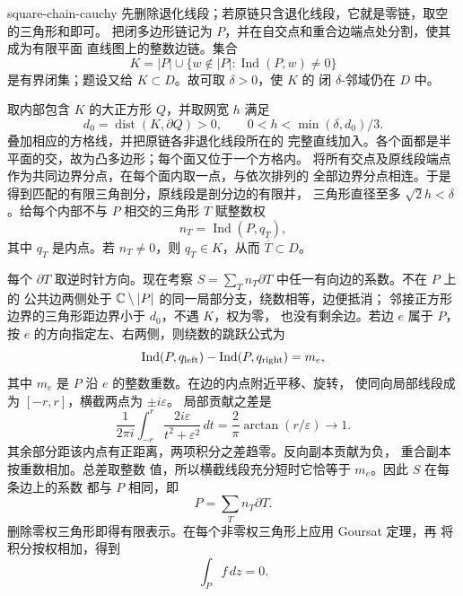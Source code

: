 \begin{solution}{square-chain-cauchy}
先删除退化线段；若原链只含退化线段，它就是零链，取空的三角形和即可。
把闭多边形链记为 \(P\)，并在自交点和重合边端点处分割，使其成为有限平面
直线图上的整数边链。集合
\[
 K=|P|\cup\{w\notin|P|:\operatorname{Ind}(P,w)\ne0\}
\]
是有界闭集；题设又给 \(K\subset D\)。故可取 \(\delta>0\)，使 \(K\) 的
闭 \(\delta\)-邻域仍在 \(D\) 中。

取内部包含 \(K\) 的大正方形 \(Q\)，并取网宽 \(h\) 满足
\[
 d_0=\operatorname{dist}(K,\partial Q)>0,
 \qquad 0<h<\min(\delta,d_0)/3.
\]
叠加相应的方格线，并把原链各非退化线段所在的
完整直线加入。各个面都是半平面的交，故为凸多边形；每个面又位于一个方格内。
将所有交点及原线段端点作为共同边界分点，在每个面内取一点，与依次排列的
全部边界分点相连。于是得到匹配的有限三角剖分，原线段是剖分边的有限并，
三角形直径至多 \(\sqrt2h<\delta\)。给每个内部不与 \(P\) 相交的三角形 \(T\) 赋整数权
\[
 n_T=\operatorname{Ind}(P,q_T),
\]
其中 \(q_T\) 是内点。若 \(n_T\ne0\)，则 \(q_T\in K\)，从而
\(\overline T\subset D\)。

每个 \(\partial T\) 取逆时针方向。现在考察 \(S=\sum_Tn_T\partial T\) 中任一有向边的系数。不在 \(P\) 上的
公共边两侧处于 \(\mathbb{C}\setminus|P|\) 的同一局部分支，绕数相等，边便抵消；
邻接正方形边界的三角形距边界小于 \(d_0\)，不遇 \(K\)，权为零，
也没有剩余边。若边 \(e\) 属于 \(P\)，按
\(e\) 的方向指定左、右两侧，则绕数的跳跃公式为
\[
 \operatorname{Ind}(P,q_{\rm left})-
 \operatorname{Ind}(P,q_{\rm right})=m_e,
\]
其中 \(m_e\) 是 \(P\) 沿 \(e\) 的整数重数。在边的内点附近平移、旋转，
使同向局部线段成为 \([-r,r]\)，横截两点为 \(\pm i\varepsilon\)。
局部贡献之差是
\[
 \frac1{2\pi i}\int_{-r}^r
 \frac{2i\varepsilon}{t^2+\varepsilon^2}\,dt
 =\frac2\pi\arctan(r/\varepsilon)\longrightarrow1.
\]
其余部分距该内点有正距离，两项积分之差趋零。反向副本贡献为负，
重合副本按重数相加。总差取整数
值，所以横截线段充分短时它恰等于 \(m_e\)。因此 \(S\) 在每条边上的系数
都与 \(P\) 相同，即
\[
 P=\sum_Tn_T\partial T.
\]
删除零权三角形即得有限表示。在每个非零权三角形上应用 Goursat 定理，再
将积分按权相加，得到
\[
 \int_Pf\,dz=0.
\]
\end{solution}
